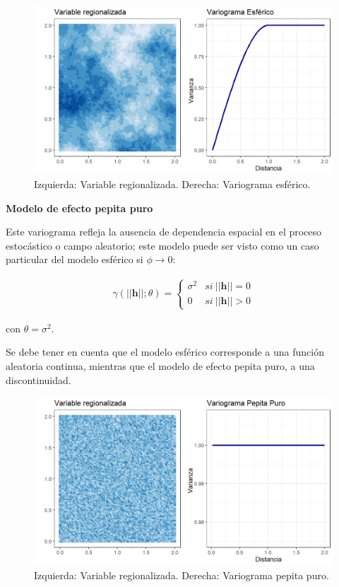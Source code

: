 \documentclass[
]{book}
\begin{document}
\begin{figure}
\includegraphics[width=17.78in]{figuras/otros/sph_var} \caption{Izquierda: Variable regionalizada. Derecha: Variograma esférico.}\label{fig:sphvar}
\end{figure}

\textbf{Modelo de efecto pepita puro}

Este variograma refleja la ausencia de dependencia espacial en el proceso estocástico o campo aleatorio; este modelo puede ser visto como un caso particular del modelo esférico si \(\phi \to 0\):

\begin{align}        
    \gamma(||\textbf{h}||;\theta) = \left \{ \begin{matrix} \sigma^2&  si \ ||\textbf{h}|| =0\\
    0 &  si\ ||\textbf{h}||>0 \end{matrix}\right.
    \end{align}

con \(\theta=\sigma^2\).

Se debe tener en cuenta que el modelo esférico corresponde a una función aleatoria continua, mientras que el modelo de efecto pepita puro, a una discontinuidad.

\begin{figure}
\includegraphics[width=17.78in]{figuras/otros/pepita_var} \caption{Izquierda: Variable regionalizada. Derecha: Variograma pepita puro.}\label{fig:unnamed-chunk-2}
\end{figure}
\end{document}
